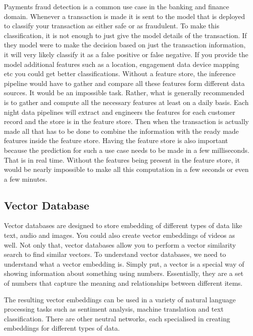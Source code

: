 \documentclass[a4paper, 11pt]{article}
\begin{document}
    Payments fraud detection is a common use case in the banking and finance domain.
    Whenever a transaction is made it is sent to the model that is deployed to classify your transaction as either safe or as fraudulent.
    To make this classification, it is not enough to just give the model details of the transaction.
    If they model were to make the decision based on just the transaction information, it will very likely classify it as a false positive or false negative.
    If you provide the model additional features such as a location, engagement data device mapping etc you could get better classifications.
    Without a feature store, the inference pipeline would have to gather and compare all these features form different data sources.
    It would be an impossible task.
    Rather, what is generally recommended is to gather and compute all the necessary features at least on a daily basis.
    Each night data pipelines will extract and engineers the features for each customer record and the store is in the feature store.
    Then when the transaction is actually made all that has to be done to combine the information with the ready made features inside the feature store.
    Having the feature store is also important because the prediction for such a use case needs to be made in a few milliseconds.
    That is in real time.
    Without the features being present in the feature store, it would be nearly impossible to make all this computation in a few seconds or even a few minutes.

    \subsection{Vector Database}
    Vector databases are designed to store embedding of different types of data like text, audio and images.
    You could also create vector embeddings of videos as well.
    Not only that, vector databases allow you to perform a vector similarity search to find similar vectors.
    To understand vector databases, we need to understand what a vector embedding is.
    Simply put, a vector is a special way of showing information about something using numbers.
    Essentially, they are a set of numbers that capture the meaning and relationships between different items.

    The resulting vector embeddings can be used in a variety of natural language processing tasks such as sentiment analysis, machine translation and text classification.
    There are other neutral networks, each specialised in creating embeddings for different types of data.
\end{document}
